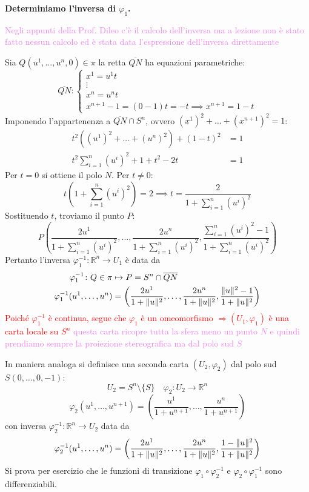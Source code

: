\begin{esempio}
        \textbf{Determiniamo l'inversa di $\varphi_1$.} 
        
        \textcolor{violet}{Negli appunti della Prof. Dileo c'è il calcolo dell'inversa ma a lezione non è stato fatto nessun calcolo ed è stata
        data l'espressione dell'inversa direttamente}

        Sia $Q(u^1, \dots, u^n, 0) \in \pi$ la retta $\overline{QN}$ ha equazioni parametriche:
        \[
        \overline{QN} :
        \begin{cases}
        x^1 = u^1 t \\
        \vdots \\
        x^n = u^n t \\
        x^{n+1} - 1 = (0 - 1)t = -t \implies x^{n+1} = 1 - t
        \end{cases}
        \]
        Imponendo l'appartenenza a $\overline{QN} \cap S^n$, ovvero $(x^1)^2 + \dots + (x^{n+1})^2 = 1$:
        \begin{align*}
        t^2 \left( (u^1)^2 + \dots + (u^n)^2 \right) + (1 - t)^2 &= 1 \\
        t^2 \sum_{i=1}^n (u^i)^2 + 1 + t^2 - 2t &= 1
        \end{align*}
        Per $t = 0$ si ottiene il polo $N$. Per $t \neq 0$:
        \[
        t \left( 1 + \sum_{i=1}^n (u^i)^2 \right) = 2 \implies t = \frac{2}{1 + \sum_{i=1}^n (u^i)^2}
        \]
        Sostituendo $t$, troviamo il punto $P$:
        \[
        P \left( \frac{2u^1}{1 + \sum_{i=1}^n (u^i)^2}, \dots, \frac{2u^n}{1 + \sum_{i=1}^n (u^i)^2}, \frac{\sum_{i=1}^n (u^i)^2 - 1}{1 + \sum_{i=1}^n (u^i)^2} \right)
        \]
        Pertanto l'inversa $\varphi_1^{-1} : \mathbb{R}^n \to U_1$ è data da
        \begin{align*}
        \varphi_1^{-1} \colon Q \in \pi &\mapsto P = S^n \cap \overline{QN} \\
        \varphi_1^{-1}(u^1, \dots, u^n) &= \left( \frac{2u^1}{1 + \lVert u\rVert^2}, \dots, \frac{2u^n}{1 + \lVert u\rVert^2}, \frac{\lVert u\rVert^2 - 1}{1 + \lVert u\rVert^2} \right)
        \end{align*}
        \textcolor{red}{Poiché $\varphi_1^{-1}$ è continua, segue che $\varphi_1$ è un omeomorfismo $\Rightarrow (U_1, \varphi_1)$ è una carta locale su $S^n$}
        \textcolor{violet}{questa carta ricopre tutta la sfera meno un punto $N$ e quindi prendiamo sempre la proiezione stereografica ma dal polo sud $S$}

        In maniera analoga si definisce una seconda carta $(U_2, \varphi_2)$ dal polo sud $S(0, \dots, 0, -1)$:
        \[
        U_2 = S^n \setminus \{S\} \quad \varphi_2 : U_2 \to \mathbb{R}^n
        \]
        \[
        \varphi_2(u^1, \dots, u^{n+1}) = \left( \frac{u^1}{1 + u^{n+1}}, \dots, \frac{u^n}{1 + u^{n+1}} \right)
        \]
        con inversa $\varphi_2^{-1} : \mathbb{R}^n \to U_2$ data da
        \[
        \varphi_2^{-1}(u^1, \dots, u^n) = \left( \frac{2u^1}{1 + \lVert u\rVert^2}, \dots, \frac{2u^n}{1 + \lVert u\rVert^2}, \frac{1 - \lVert u\rVert^2}{1 + \lVert u\rVert^2} \right)
        \]
        Si prova per esercizio che le funzioni di transizione $\varphi_1 \circ \varphi_2^{-1}$ e $\varphi_2 \circ \varphi_1^{-1}$ sono differenziabili. 
        

\end{esempio}
